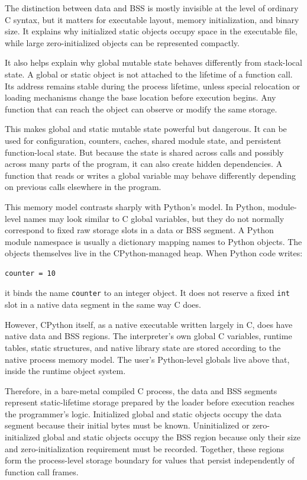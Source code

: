 The distinction between data and BSS is mostly invisible at the level of ordinary C syntax, but it matters for executable layout, memory initialization, and binary size. It explains why initialized static objects occupy space in the executable file, while large zero-initialized objects can be represented compactly.

It also helps explain why global mutable state behaves differently from stack-local state. A global or static object is not attached to the lifetime of a function call. Its address remains stable during the process lifetime, unless special relocation or loading mechanisms change the base location before execution begins. Any function that can reach the object can observe or modify the same storage.

This makes global and static mutable state powerful but dangerous. It can be used for configuration, counters, caches, shared module state, and persistent function-local state. But because the state is shared across calls and possibly across many parts of the program, it can also create hidden dependencies. A function that reads or writes a global variable may behave differently depending on previous calls elsewhere in the program.

This memory model contrasts sharply with Python's model. In Python, module-level names may look similar to C global variables, but they do not normally correspond to fixed raw storage slots in a data or BSS segment. A Python module namespace is usually a dictionary mapping names to Python objects. The objects themselves live in the CPython-managed heap. When Python code writes:

\begin{verbatim}
counter = 10
\end{verbatim}

it binds the name \texttt{counter} to an integer object. It does not reserve a fixed \texttt{int} slot in a native data segment in the same way C does.

However, CPython itself, as a native executable written largely in C, does have native data and BSS regions. The interpreter's own global C variables, runtime tables, static structures, and native library state are stored according to the native process memory model. The user's Python-level globals live above that, inside the runtime object system.

Therefore, in a bare-metal compiled C process, the data and BSS segments represent static-lifetime storage prepared by the loader before execution reaches the programmer's logic. Initialized global and static objects occupy the data segment because their initial bytes must be known. Uninitialized or zero-initialized global and static objects occupy the BSS region because only their size and zero-initialization requirement must be recorded. Together, these regions form the process-level storage boundary for values that persist independently of function call frames.


